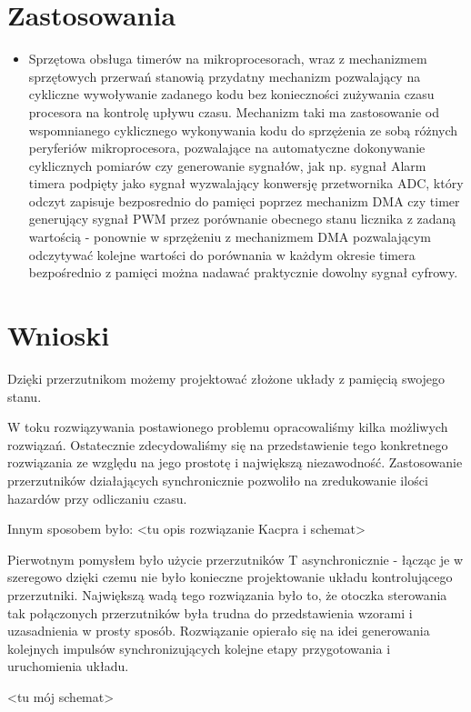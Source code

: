 \documentclass[a4paper]{article}
\begin{document}
\section{Zastosowania}
\begin{itemize}
    \item Sprzętowa obsługa timerów na mikroprocesorach, wraz z mechanizmem sprzętowych przerwań stanowią przydatny mechanizm
            pozwalający na cykliczne wywoływanie zadanego kodu bez konieczności zużywania czasu procesora na kontrolę upływu 
            czasu. Mechanizm taki ma zastosowanie od wspomnianego cyklicznego wykonywania kodu do sprzężenia ze sobą różnych peryferiów
            mikroprocesora, pozwalające na automatyczne dokonywanie cyklicznych pomiarów czy generowanie sygnałów, jak np. 
            sygnał Alarm timera podpięty jako sygnał wyzwalający konwersję przetwornika ADC, który odczyt zapisuje bezposrednio do pamięci
            poprzez mechanizm DMA czy timer generujący sygnał PWM przez porównanie obecnego stanu licznika z zadaną wartością - ponownie
            w sprzężeniu z mechanizmem DMA pozwalającym odczytywać kolejne wartości do porównania w każdym okresie timera bezpośrednio z pamięci
            można nadawać praktycznie dowolny sygnał cyfrowy.  %
\end{itemize}
\section{Wnioski}
Dzięki przerzutnikom możemy projektować złożone układy z pamięcią swojego stanu. 

W toku rozwiązywania postawionego problemu opracowaliśmy kilka możliwych rozwiązań. Ostatecznie
zdecydowaliśmy się na przedstawienie tego konkretnego rozwiązania ze względu na jego prostotę i 
największą niezawodność. Zastosowanie przerzutników działających synchronicznie pozwoliło na zredukowanie
ilości hazardów przy odliczaniu czasu.

Innym sposobem było: <tu opis rozwiązanie Kacpra i schemat> %

Pierwotnym pomysłem było użycie przerzutników T asynchronicznie - łącząc je w szeregowo dzięki czemu 
nie było konieczne projektowanie układu kontrolującego przerzutniki. Największą wadą tego rozwiązania
było to, że otoczka sterowania tak połączonych przerzutników była trudna do przedstawienia wzorami i 
uzasadnienia w prosty sposób. Rozwiązanie opierało się na idei generowania kolejnych impulsów 
synchronizujących kolejne etapy przygotowania i uruchomienia układu.

<tu mój schemat> %
\end{document}

